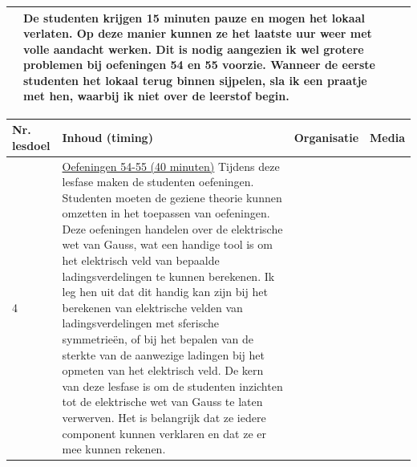 \begin{landscape}
\begin{tabularx}{1.56\textwidth}{|p{1.5cm}|p{6cm}|X|p{4cm}|}
	
	&    De studenten krijgen 15 minuten pauze en mogen het lokaal verlaten. Op deze manier kunnen ze het laatste uur weer met volle aandacht werken. Dit is nodig aangezien ik wel grotere problemen bij oefeningen 54 en 55 voorzie.\newline
	Wanneer de eerste studenten het lokaal terug binnen sijpelen, sla ik een praatje met hen, waarbij ik niet over de leerstof begin. 
	& 
	\\ \hline
\end{tabularx}



\begin{tabularx}{1.56\textwidth}{|p{1.5cm}|p{6cm}|X|p{4cm}|}
	\hline
	\textbf{Nr. lesdoel } & \textbf{Inhoud (timing)}  & \textbf{Organisatie } & \textbf{Media } \\ \hline
	4\newline 5\newline 6\newline 7 \newline 8 \newline 9	&\underline{Oefeningen 54-55 (40 minuten)}\newline
	Tijdens deze lesfase maken de studenten oefeningen. Studenten moeten de geziene theorie kunnen omzetten in het toepassen van oefeningen. Deze oefeningen handelen over de elektrische wet van Gauss, wat een handige tool is om het elektrisch veld van bepaalde ladingsverdelingen te kunnen berekenen. Ik leg hen uit dat dit handig kan zijn bij het berekenen van elektrische velden van ladingsverdelingen met sferische symmetrieën, of bij het bepalen van de sterkte van de aanwezige ladingen bij het opmeten van het elektrisch veld.  \newline De kern van deze lesfase is om de studenten inzichten tot de elektrische wet van Gauss te laten verwerven. Het is belangrijk dat ze iedere component kunnen verklaren en dat ze er mee kunnen rekenen.
	

\end{tabularx}
\end{landscape}
